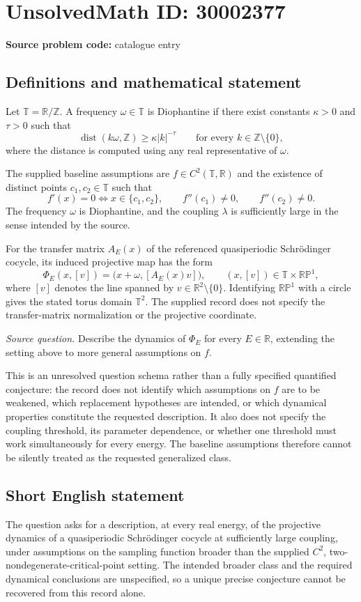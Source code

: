 \documentclass[11pt]{article}
\newcommand{\Z}{\mathbb{Z}}
\newcommand{\R}{\mathbb{R}}
\begin{document}
\section*{UnsolvedMath ID: 30002377}
\textbf{Source problem code:} catalogue entry
\subsection{Definitions and mathematical statement}
Let \(\mathbb T=\R/\Z\). A frequency \(\omega\in\mathbb T\) is Diophantine if there exist constants \(\kappa>0\) and \(\tau>0\) such that
\[
\operatorname{dist}(k\omega,\Z)\geq \kappa |k|^{-\tau}
\qquad\text{for every }k\in\Z\setminus\{0\},
\]
where the distance is computed using any real representative of \(\omega\).

The supplied baseline assumptions are \(f\in C^2(\mathbb T,\R)\) and the existence of distinct points \(c_1,c_2\in\mathbb T\) such that
\[
f'(x)=0\iff x\in\{c_1,c_2\},\qquad f''(c_1)\ne0,\qquad f''(c_2)\ne0.
\]
The frequency \(\omega\) is Diophantine, and the coupling \(\lambda\) is sufficiently large in the sense intended by the source.

For the transfer matrix \(A_E(x)\) of the referenced quasiperiodic Schr\"odinger cocycle, its induced projective map has the form
\[
\Phi_E(x,[v])=\bigl(x+\omega,[A_E(x)v]\bigr),
\qquad (x,[v])\in\mathbb T\times\mathbb{RP}^{1},
\]
where \([v]\) denotes the line spanned by \(v\in\R^2\setminus\{0\}\). Identifying \(\mathbb{RP}^{1}\) with a circle gives the stated torus domain \(\mathbb T^2\). The supplied record does not specify the transfer-matrix normalization or the projective coordinate.

\emph{Source question.} Describe the dynamics of \(\Phi_E\) for every \(E\in\R\), extending the setting above to more general assumptions on \(f\).

This is an unresolved question schema rather than a fully specified quantified conjecture: the record does not identify which assumptions on \(f\) are to be weakened, which replacement hypotheses are intended, or which dynamical properties constitute the requested description. It also does not specify the coupling threshold, its parameter dependence, or whether one threshold must work simultaneously for every energy. The baseline assumptions therefore cannot be silently treated as the requested generalized class.
\subsection{Short English statement}
The question asks for a description, at every real energy, of the projective dynamics of a quasiperiodic Schr\"odinger cocycle at sufficiently large coupling, under assumptions on the sampling function broader than the supplied \(C^2\), two-nondegenerate-critical-point setting. The intended broader class and the required dynamical conclusions are unspecified, so a unique precise conjecture cannot be recovered from this record alone.
\end{document}
